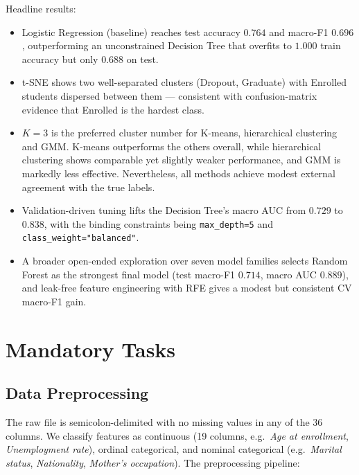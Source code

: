 \documentclass[11pt]{article}
\begin{document}
Headline results:
\begin{itemize}
  \item Logistic Regression (baseline) reaches test accuracy $0.764$
        and macro-F1 $0.696$, outperforming an unconstrained Decision
        Tree that overfits to $1.000$ train accuracy but only $0.688$
        on test.
  \item t-SNE shows two well-separated clusters (Dropout,
        Graduate) with Enrolled students dispersed between them —
        consistent with confusion-matrix evidence that Enrolled is
        the hardest class.
  \item $K{=}3$ is the preferred cluster number for K-means, hierarchical 
        clustering and GMM. K-means outperforms the others overall, while 
        hierarchical clustering shows comparable yet slightly weaker performance, 
        and GMM is markedly less effective. Nevertheless, all methods achieve 
        modest external agreement with the true labels.
  \item Validation-driven tuning lifts the Decision Tree's macro AUC
        from $0.729$ to $0.838$, with the binding constraints being
        \texttt{max\_depth=5} and \texttt{class\_weight="balanced"}.
  \item A broader open-ended exploration over seven model families selects
        Random Forest as the strongest final model (test macro-F1
        $0.714$, macro AUC $0.889$), and leak-free feature engineering
        with RFE gives a modest but consistent CV macro-F1 gain.
\end{itemize}

\section{Mandatory Tasks}

\subsection{Data Preprocessing}

The raw file is semicolon-delimited with no missing values in any of
the 36 columns. We classify features as continuous (19 columns,
e.g.\ \emph{Age at enrollment}, \emph{Unemployment rate}), ordinal
categorical, and nominal categorical (e.g.\ \emph{Marital status},
\emph{Nationality}, \emph{Mother's occupation}). The preprocessing
pipeline:
\end{document}
